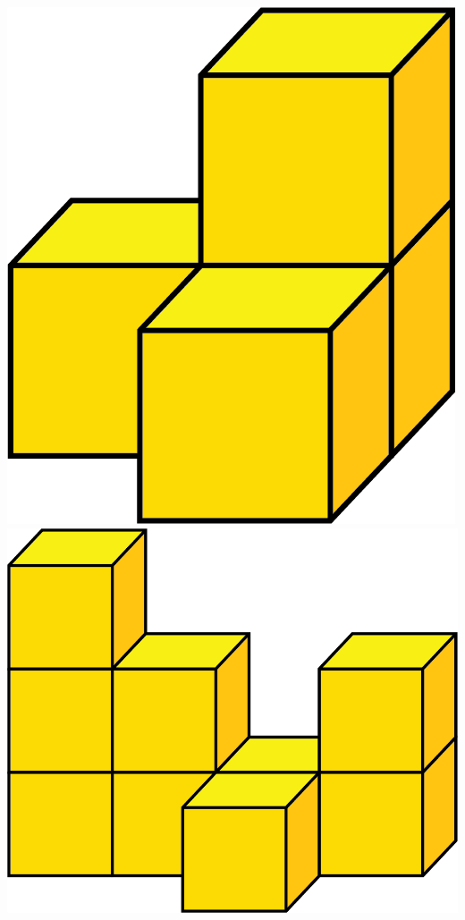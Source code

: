 	\vspace*{-100pt}
	\begin{adjustwidth}{180pt}{0pt}
		\includegraphics[scale=0.3]{9a}\quad
		\includegraphics[scale=0.3]{9b}\quad

\end{adjustwidth}
